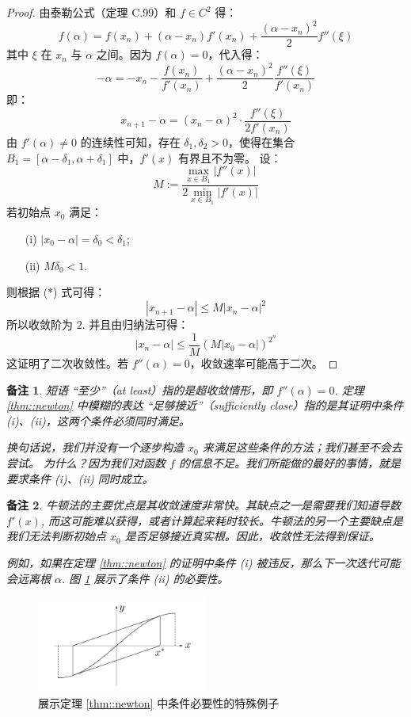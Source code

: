 \documentclass[a4paper]{ctexart}
\newtheorem{remark}{备注}
\numberwithin{theorem}{section}
\numberwithin{equation}{section}
\numberwithin{figure}{section}
\numberwithin{remark}{section}
\begin{document}
\begin{proof}
由泰勒公式（定理 C.99）和 \(f \in C^2\) 得：
\[
f(\alpha) = f(x_n) + (\alpha - x_n) f'(x_n) + \frac{(\alpha - x_n)^2}{2} f''(\xi)
\]
其中 \(\xi\) 在 \(x_n\) 与 \(\alpha\) 之间。因为 \(f(\alpha) = 0\)，代入得：
\[
- \alpha = - x_n - \frac{f(x_n)}{f'(x_n)} + \frac{(\alpha - x_n)^2}{2} \frac{f''(\xi)}{f'(x_n)}
\]
即：
\[
x_{n+1} - \alpha = (x_n - \alpha)^2 \cdot \frac{f''(\xi)}{2f'(x_n)} \tag{*}
\]
由 \(f'(\alpha) \ne 0\) 的连续性可知，存在 \(\delta_1, \delta_2 > 0\)，使得在集合 \(B_1 = [\alpha - \delta_1, \alpha + \delta_1]\) 中，\(f'(x)\) 有界且不为零。
设：
\[
M := \frac{\max_{x \in B_1} |f''(x)|}{2 \min_{x \in B_1} |f'(x)|}
\]
若初始点 \(x_0\) 满足：
\begin{itemize}
    \item[(i)] \(|x_0 - \alpha| = \delta_0 < \delta_1\);
    \item[(ii)] \(M \delta_0 < 1\).
\end{itemize}
则根据 (*) 式可得：
\[
|x_{n+1} - \alpha| \le M |x_n - \alpha|^2
\]
所以收敛阶为 $2$. 并且由归纳法可得：
\[
|x_n - \alpha| \le \frac{1}{M} (M |x_0 - \alpha|)^{2^n}
\]
这证明了二次收敛性。若 \(f''(\alpha) = 0\)，收敛速率可能高于二次。 
\end{proof}

\begin{remark}
短语 “至少”（at least）指的是超收敛情形，即 \( f''(\alpha) = 0 \). 
定理 \ref{thm::newton} 中模糊的表达 “足够接近”（sufficiently close）指的是其证明中条件 (i)、(ii)，这两个条件必须同时满足。

换句话说，我们并没有一个逐步构造 \( x_0 \) 来满足这些条件的方法；我们甚至不会去尝试。
为什么？因为我们对函数 \( f \) 的信息不足。我们所能做的最好的事情，就是要求条件 (i)、(ii) 同时成立。
\end{remark}

\begin{remark}
牛顿法的主要优点是其收敛速度非常快。其缺点之一是需要我们知道导数 \( f'(x) \), 
而这可能难以获得，或者计算起来耗时较长。牛顿法的另一个主要缺点是我们无法判断初始点 \( x_0 \) 是否足够接近真实根。因此，收敛性无法得到保证。

例如，如果在定理 \ref{thm::newton} 的证明中条件 (i) 被违反，那么下一次迭代可能会远离根 \(\alpha\). 图 \ref{fig::newton_cond} 展示了条件 (ii) 的必要性。
\end{remark}

\begin{figure}
    \label{fig::newton_cond}
\centering
\includegraphics[width=0.5\textwidth]{images/newton_cond.png} %
\caption{展示定理 \ref{thm::newton} 中条件必要性的特殊例子}
\end{figure}
\end{document}
